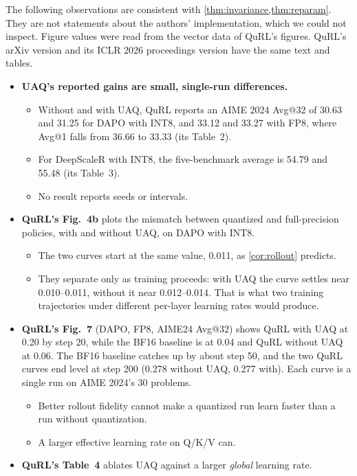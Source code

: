 The following observations are consistent with \cref{thm:invariance,thm:reparam}. They are not statements about the authors' implementation, which we could not inspect. Figure values were read from the vector data of QuRL's figures. QuRL's arXiv version and its ICLR 2026 proceedings version have the same text and tables.
\begin{itemize}[leftmargin=*,itemsep=2pt]
\item \textbf{UAQ's reported gains are small, single-run differences.}
  \begin{itemize}[leftmargin=*,itemsep=1pt]
  \item Without and with UAQ, QuRL reports an AIME 2024 Avg@32 of 30.63 and 31.25 for DAPO with INT8, and 33.12 and 33.27 with FP8, where Avg@1 falls from 36.66 to 33.33 (its Table~2).
  \item For DeepScaleR with INT8, the five-benchmark average is 54.79 and 55.48 (its Table~3).
  \item No result reports seeds or intervals.
  \end{itemize}
\item \textbf{QuRL's Fig.~4b} plots the mismatch between quantized and full-precision policies, with and without UAQ, on DAPO with INT8.
  \begin{itemize}[leftmargin=*,itemsep=1pt]
  \item The two curves start at the same value, 0.011, as \cref{cor:rollout} predicts.
  \item They separate only as training proceeds: with UAQ the curve settles near 0.010--0.011, without it near 0.012--0.014. That is what two training trajectories under different per-layer learning rates would produce.
  \end{itemize}
\item \textbf{QuRL's Fig.~7} (DAPO, FP8, AIME24 Avg@32) shows QuRL with UAQ at 0.20 by step 20, while the BF16 baseline is at 0.04 and QuRL without UAQ at 0.06. The BF16 baseline catches up by about step 50, and the two QuRL curves end level at step 200 (0.278 without UAQ, 0.277 with). Each curve is a single run on AIME 2024's 30 problems.
  \begin{itemize}[leftmargin=*,itemsep=1pt]
  \item Better rollout fidelity cannot make a quantized run learn faster than a run without quantization.
  \item A larger effective learning rate on Q/K/V can.
  \end{itemize}
\item \textbf{QuRL's Table~4} ablates UAQ against a larger \emph{global} learning rate.

\end{itemize}
